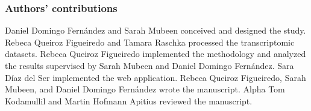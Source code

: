 \subsubsection{Authors' contributions}

Daniel Domingo Fernández and Sarah Mubeen conceived and designed the study. Rebeca Queiroz Figueiredo and Tamara Raschka processed the transcriptomic datasets. Rebeca Queiroz Figueiredo implemented the methodology and analyzed the results supervised by Sarah Mubeen and Daniel Domingo Fernández. Sara Díaz del Ser implemented the web application. Rebeca Queiroz Figueiredo, Sarah Mubeen, and Daniel Domingo Fernández wrote the manuscript. Alpha Tom Kodamullil and Martin Hofmann Apitius reviewed the manuscript.